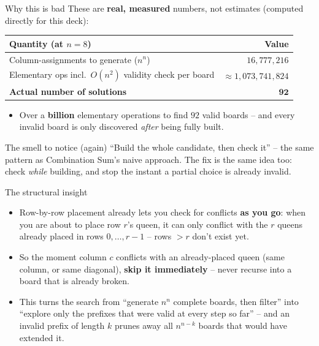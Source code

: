 \documentclass[11pt,aspectratio=169]{beamer}
\begin{document}
\begin{frame}{Why this is bad}
  \small
  These are \textbf{real, measured} numbers, not estimates (computed directly for
  this deck):
  \begin{center}
  \begin{tabular}{@{}lr@{}}
    \toprule
    Quantity (at $n=8$) & Value \\
    \midrule
    Column-assignments to generate ($n^n$) & $16{,}777{,}216$ \\
    Elementary ops incl.\ $O(n^2)$ validity check per board & $\approx 1{,}073{,}741{,}824$ \\
    \textbf{Actual number of solutions} & $\mathbf{92}$ \\
    \bottomrule
  \end{tabular}
  \end{center}
  \begin{itemize}
    \item Over a \textbf{billion} elementary operations to find $92$ valid boards --
    and every invalid board is only discovered \emph{after} being fully built.
  \end{itemize}
  \begin{alertblock}{The smell to notice (again)}
    ``Build the whole candidate, then check it'' -- the same pattern as Combination
    Sum's naive approach. The fix is the same idea too: check \emph{while} building, and
    stop the instant a partial choice is already invalid.
  \end{alertblock}
\end{frame}

\begin{frame}{The structural insight}
  \begin{itemize}
    \item Row-by-row placement already lets you check for conflicts \textbf{as you
    go}: when you are about to place row $r$'s queen, it can only conflict with the
    $r$ queens already placed in rows $0, \dots, r-1$ -- rows $>r$ don't exist yet.
    \item So the moment column $c$ conflicts with an already-placed queen (same
    column, or same diagonal), \textbf{skip it immediately} -- never recurse into a
    board that is already broken.
    \item This turns the search from ``generate $n^n$ complete boards, then filter''
    into ``explore only the prefixes that were valid at every step so far'' -- and an
    invalid prefix of length $k$ prunes away all $n^{n-k}$ boards that would have
    extended it.
  \end{itemize}
\end{frame}
\end{document}
